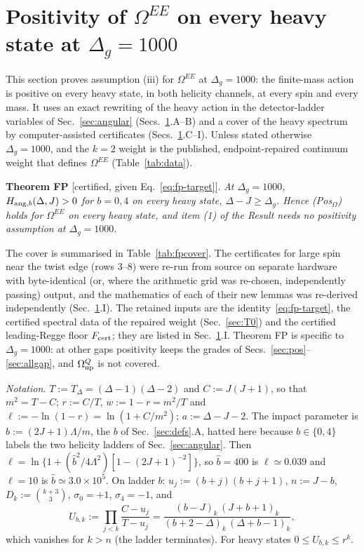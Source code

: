 \section{Positivity of \texorpdfstring{$\Omega^{EE}$}{Omega EE} on every heavy state at \texorpdfstring{$\Delta_g=1000$}{Delta g = 1000}}
\label{sec:fullpos}

This section proves assumption (iii) for $\Omega^{EE}$ at $\Delta_g=1000$: the finite-mass action is positive on every heavy state,
in both helicity channels, at every spin and every mass. It uses an exact rewriting of the heavy action in the detector-ladder
variables of Sec.~\ref{sec:angular} (Secs.~\ref{sec:fullpos}.A--B) and a cover of the heavy spectrum by computer-assisted
certificates (Secs.~\ref{sec:fullpos}.C--I). Unless stated otherwise $\Delta_g=1000$, and the $k=2$ weight is the published,
endpoint-repaired continuum weight that defines $\Omega^{EE}$ (Table~\ref{tab:data}).

\textbf{Theorem FP} [certified, given Eq.~\eqref{eq:fp-target}]. \emph{At $\Delta_g=1000$, $H_{{\rm ang},b}(\Delta,J)>0$ for $b=0,4$ on every
heavy state, $\Delta-J\ge\Delta_g$. Hence (Pos$_\Omega$) holds for $\Omega^{EE}$ on every heavy state, and item (1) of the Result needs no
positivity assumption at $\Delta_g=1000$.}

The cover is summarised in Table~\ref{tab:fpcover}. The certificates for large spin near the twist edge (rows 3--8) were
re-run from source on separate hardware with byte-identical (or, where the arithmetic grid was re-chosen, independently passing)
output, and the mathematics of each of their new lemmas was re-derived independently (Sec.~\ref{sec:fullpos}.I). The retained inputs are the identity~\eqref{eq:fp-target}, the certified spectral
data of the repaired weight (Sec.~\ref{sec:T0}) and the certified leading-Regge floor $F_{\rm cert}$; they are listed in
Sec.~\ref{sec:fullpos}.I. Theorem FP is specific to $\Delta_g=1000$: at other gaps positivity keeps the grades of
Secs.~\ref{sec:pos}--\ref{sec:allgap}, and $\Omega^Q_{\rm up}$ is not covered.

\emph{Notation.} $T:=T_\Delta=(\Delta-1)(\Delta-2)$ and $C:=J(J+1)$, so that $m^2=T-C$; $r:=C/T$, $w:=1-r=m^2/T$ and
$\ell:=-\ln(1-r)=\ln(1+C/m^2)$; $a:=\Delta-J-2$. The impact parameter is $\hat b:=(2J+1)\Lambda/m$, the $b$ of Sec.~\ref{sec:defs}.A,
hatted here because $b\in\{0,4\}$ labels the two helicity ladders of Sec.~\ref{sec:angular}. Then
$\ell=\ln\{1+(\hat b^2/4\Lambda^2)[1-(2J+1)^{-2}]\}$, so $\hat b=400$ is $\ell\simeq0.039$ and $\ell=10$ is $\hat b\simeq3.0\times10^5$.
On ladder $b$: $u_j:=(b+j)(b+j+1)$, $n:=J-b$, $D_k:=\binom{k+3}{3}$, $\sigma_0=+1$, $\sigma_4=-1$, and
\begin{equation}
U_{b,k}:=\prod_{j<k}\frac{C-u_j}{T-u_j}=\frac{(b-J)_k\,(J+b+1)_k}{(b+2-\Delta)_k\,(\Delta+b-1)_k},
\label{eq:fp-U}
\end{equation}
which vanishes for $k>n$ (the ladder terminates). For heavy states $0\le U_{b,k}\le r^k$.

